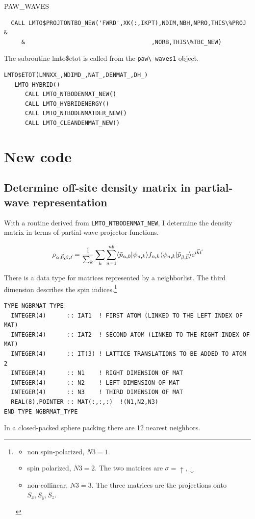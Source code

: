 \documentclass[11pt,a4paper]{report}
\begin{document}
PAW\_WAVES
\begin{verbatim}
  CALL LMTO$PROJTONTBO_NEW('FWRD',XK(:,IKPT),NDIM,NBH,NPRO,THIS\%PROJ &
     &                                    ,NORB,THIS\%TBC_NEW)
\end{verbatim}



The subroutine lmto\$etot is called from the \verb|paw\_waves1| object. 
\begin{verbatim}
LMTO$ETOT(LMNXX_,NDIMD_,NAT_,DENMAT_,DH_)
   LMTO_HYBRID()
      CALL LMTO_NTBODENMAT_NEW() 
      CALL LMTO_HYBRIDENERGY()
      CALL LMTO_NTBODENMATDER_NEW()
      CALL LMTO_CLEANDENMAT_NEW()
\end{verbatim}

\section{New code}
\subsection{Determine off-site density matrix in partial-wave representation}
With a routine derived from \verb|LMTO_NTBODENMAT_NEW|, I determine
the density matrix in terms of partial-wave projector functions.

\begin{eqnarray}
\rho_{\alpha,\vec{0},\beta,\vec{t}}
=\frac{1}{\sum_k}\sum_k\sum_{n=1}^{nb}
\langle\tilde{p}_{\alpha,0}|\psi_{n,k}\rangle f_{n,k}
\langle\psi_{n,k}|\tilde{p}_{\beta,\vec{0}}\rangle\mathrm{e}^{i\vec{k}\vec{t}}
\end{eqnarray}

There is a data type for matrices represented by a neighborlist.
The third dimension describes the spin indices.\footnote{
\begin{itemize}
\item non spin-polarized, $N3=1$.
\item spin polarized, $N3=2$. The two matrices are $\sigma=\uparrow,\downarrow$
\item non-collinear, $N3=3$. The three matrices are the projections
  onto $S_x,S_y,S_z$.
\end{itemize}
} 
\begin{verbatim}
TYPE NGBRMAT_TYPE
  INTEGER(4)      :: IAT1  ! FIRST ATOM (LINKED TO THE LEFT INDEX OF MAT)
  INTEGER(4)      :: IAT2  ! SECOND ATOM (LINKED TO THE RIGHT INDEX OF MAT)
  INTEGER(4)      :: IT(3) ! LATTICE TRANSLATIONS TO BE ADDED TO ATOM 2
  INTEGER(4)      :: N1    ! RIGHT DIMENSION OF MAT
  INTEGER(4)      :: N2    ! LEFT DIMENSION OF MAT
  INTEGER(4)      :: N3    ! THIRD DIMENSION OF MAT
  REAL(8),POINTER :: MAT(:,:,:)  !(N1,N2,N3)
END TYPE NGBRMAT_TYPE
\end{verbatim}
In a closed-packed sphere packing there are 12 nearest neighbors.
\end{document}
